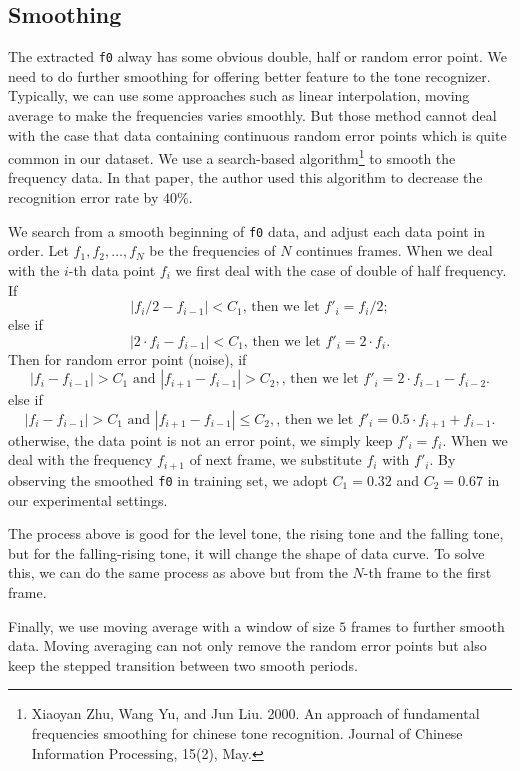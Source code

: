 \documentclass[a4paper]{article}
\begin{document}
\subsection{Smoothing}
The extracted \texttt{f0} alway has some obvious double, half or random error point. We need to do further smoothing for offering better feature to the tone recognizer. Typically, we can use some approaches such as linear interpolation, moving average to make the frequencies varies smoothly. But those method cannot deal with the case that data containing continuous random error points which is quite common in our dataset. We use a search-based algorithm\footnote{{Xiaoyan Zhu, Wang Yu, and Jun Liu. 2000. An approach of fundamental frequencies smoothing for chinese tone recognition. Journal of Chinese Information Processing, 15(2), May.}}
	to smooth the frequency data. In that paper, the author used this algorithm to decrease the recognition error rate by $40\%$. 
	
We search from a smooth beginning of \texttt{f0} data, and adjust each data point in order. Let $f_1, f_2, \dots, f_{N}$ be the frequencies of $N$ continues frames. When we deal with the $i$-th data point $f_i$ we first deal with the case of double of half frequency. If 
\[ |f_i / 2 - f_{i-1}| < C_1 \text{, then we let } f'_i = f_i / 2;\]
else if 
\[ |2 \cdot f_i- f_{i-1}| < C_1 \text{, then we let } f'_i = 2 \cdot f_i.\]
Then for random error point (noise), if
\[|f_i - f_{i - 1}| > C_1 \text{ and } |f_{i + 1} - f_{i - 1}| > C_2,\text{, then we let } f'_i = 2 \cdot f_{i- 1} - f_{i - 2}. \]
else if
\[|f_i - f_{i - 1}| > C_1 \text{ and } |f_{i + 1} - f_{i - 1}| \leq C_2,\text{, then we let } f'_i = 0.5 \cdot f_{i + 1} + f_{i - 1}. \]
otherwise, the data point is not an error point, we simply keep $f'_i = f_i$. When we deal with the frequency $f_{i+1}$ of next frame, we substitute $f_{i}$ with $f'_i$. By observing the smoothed \texttt{f0} in training set, we adopt $C_1 = 0.32$ and $C_2 = 0.67$ in our experimental settings.

The process above is good for the level tone, the rising tone and the falling tone, but for the falling-rising tone, it will change the shape of data curve. To solve this, we can do the same process as above but from the $N$-th frame to the first frame.

Finally, we use moving average with a window of size $5$ frames to further smooth data. Moving averaging can not only remove the random error points but also keep the stepped transition between two smooth periods.
\end{document}
